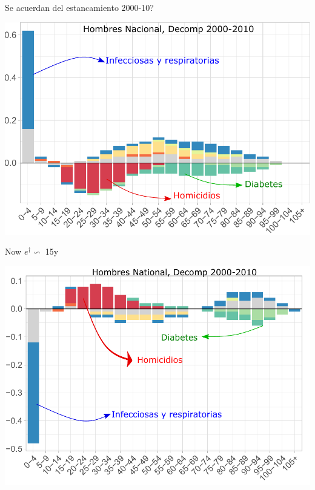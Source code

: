 \documentclass[xcolor={dvipsnames}]{beamer}
\begin{document}
\begin{frame}





\Large{
Se acuerdan del estancamiento 2000-10?

				\begin{center}
		\includegraphics[scale=.65]{Figures/Fig_1}
				\end{center}
				

}
\end{frame}


\begin{frame}

\Large{
Now $e^\dagger \backsim$ 15y

				\begin{center}
		\includegraphics[scale=.65]{Figures/Cause_ed_decomp_Males}
				\end{center}				

}
\end{frame}
\end{document}
